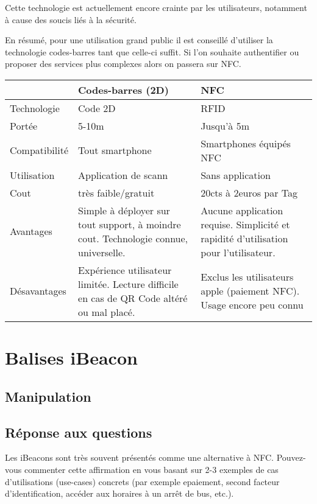 \documentclass[francais,12pt]{article}
\begin{document}
	Cette technologie est actuellement encore crainte par les utilisateurs, notamment à cause des soucis liés à la sécurité. 	
	
	En résumé, pour une utilisation grand public il est conseillé d'utiliser la technologie codes-barres tant que celle-ci suffit. Si l'on souhaite authentifier ou proposer des services plus complexes alors on passera sur NFC.
		
	\begin{tabular}{|l|p{6cm}|p{6cm}|}
		\hline 
		\rowcolor{lightgray}& Codes-barres (2D) & NFC \\ 
		\hline 
		Technologie & Code 2D  & RFID  \\ 
		\hline 
		Portée & 5-10m  & Jusqu'à 5m \\ 
		\hline 
		Compatibilité & Tout smartphone  & Smartphones équipés NFC  \\ 
		\hline 
		Utilisation & Application de scann & Sans application \\ 
		\hline 
		Cout &  très faible/gratuit & 20cts à 2euros par Tag \\ 
		\hline 
		Avantages & Simple à déployer sur tout support, à moindre cout. Technologie connue, universelle.  & Aucune application requise. Simplicité et rapidité d'utilisation pour l'utilisateur. \\ 
		\hline 
		Désavantages & Expérience utilisateur limitée. Lecture difficile en cas de QR Code altéré ou mal placé. & Exclus les utilisateurs apple (paiement NFC). Usage encore peu connu \\ 
		\hline 
	\end{tabular} 
	
	\section*{Balises iBeacon}
	\subsection*{Manipulation}
	\subsection*{Réponse aux questions}
	Les iBeacons sont très souvent présentés comme une alternative à NFC. Pouvez-vous commenter cette affirmation en vous basant sur 2-3 exemples de cas d’utilisations (use-cases) concrets (par exemple epaiement, second facteur d’identification, accéder aux horaires à un arrêt de bus, etc.). 
\end{document}

